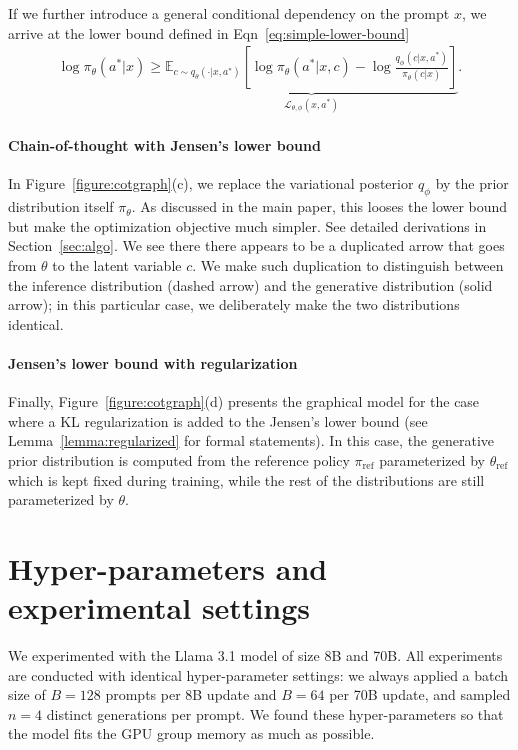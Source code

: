 \documentclass{article}
\theoremstyle{definition}
\begin{document}
\begin{appendix}
If we further introduce a general conditional dependency on the prompt $x$, we arrive at the lower bound defined in Eqn~\eqref{eq:simple-lower-bound}
\begin{align*}
    \log \pi_\theta(a^*|x) \geq \underbrace{\mathbb{E}_{c\sim q_\theta(\cdot|x,a^*)}\left[\log \pi_\theta(a^*|x,c) - \log\frac{q_\phi(c|x,a^*)}{\pi_\theta(c|x)}\right]}_{\mathcal{L}_{\theta,\phi}(x,a^*)}.
\end{align*}

\paragraph{Chain-of-thought with Jensen's lower bound} In Figure~\ref{figure:cotgraph}(c), we replace the variational posterior $q_\phi$ by the prior distribution itself $\pi_\theta$. As discussed in the main paper, this looses the lower bound but make the optimization objective much simpler. See detailed derivations in Section~\ref{sec:algo}. We see there there appears to be a duplicated arrow that goes from $\theta$ to the latent variable $c$. We make such duplication to distinguish between the inference distribution (dashed arrow) and the generative distribution (solid arrow); in this particular case, we deliberately make the two distributions identical.

\paragraph{Jensen's lower bound with regularization} Finally, Figure~\ref{figure:cotgraph}(d) presents the graphical model for the case where a KL regularization is added to the Jensen's lower bound (see Lemma~\ref{lemma:regularized} for formal statements). In this case, the generative prior distribution is computed from the reference policy $\pi_\text{ref}$ parameterized by $\theta_\text{ref}$ which is kept fixed during training, while the rest of the distributions are still parameterized by $\theta$.

\section{Hyper-parameters and experimental settings} \label{appendix:hypers}

We experimented with the Llama 3.1 model of size 8B and 70B. All experiments are conducted with identical hyper-parameter settings: we always applied a batch size of $B=128$ prompts per 8B update and $B=64$ per 70B update, and sampled $n=4$ distinct generations per prompt. We found these hyper-parameters so that the model fits the GPU group memory as much as possible.


\end{appendix}
\end{document}

